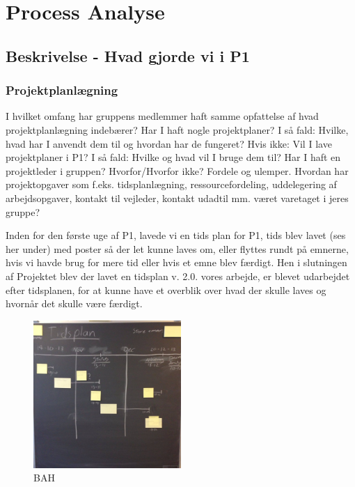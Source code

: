 \documentclass[a4paper,12pt,twoside,openright]{memoir}
\begin{document}
\chapter{Process Analyse}

    \section{Beskrivelse - Hvad gjorde vi i P1} 

        \subsection{Projektplanlægning}
            I hvilket omfang har gruppens medlemmer haft samme opfattelse af hvad projektplanlægning indebærer? 
            Har I haft nogle projektplaner? I så fald: Hvilke, hvad har I anvendt dem til og hvordan har de fungeret? Hvis ikke: Vil I lave projektplaner i P1? I så fald: Hvilke og hvad vil I bruge dem til? 
            Har I haft en projektleder i gruppen? Hvorfor/Hvorfor ikke? Fordele og ulemper. 
            Hvordan har projektopgaver som f.eks. tidsplanlægning, ressourcefordeling, uddelegering af arbejdsopgaver, kontakt til vejleder, kontakt udadtil mm. været varetaget i jeres gruppe? 

            Inden for den første uge af P1, lavede vi en tids plan for P1, tids blev lavet (ses her under) med poster så der let kunne laves om, eller flyttes rundt på emnerne, hvis vi havde brug for mere tid eller hvis et emne blev færdigt. Hen i slutningen af Projektet blev der lavet  en tidsplan v. 2.0. vores arbejde, er blevet udarbejdet  efter tidsplanen, for at kunne have et overblik over hvad der skulle laves og hvornår det skulle være færdigt.

            \begin{figure}[ht!]
                \centering
                \includegraphics[width=0.5\textwidth]{Images/9.jpg}
                \caption{BAH}
                \label{4}
            \end{figure}
\end{document}
